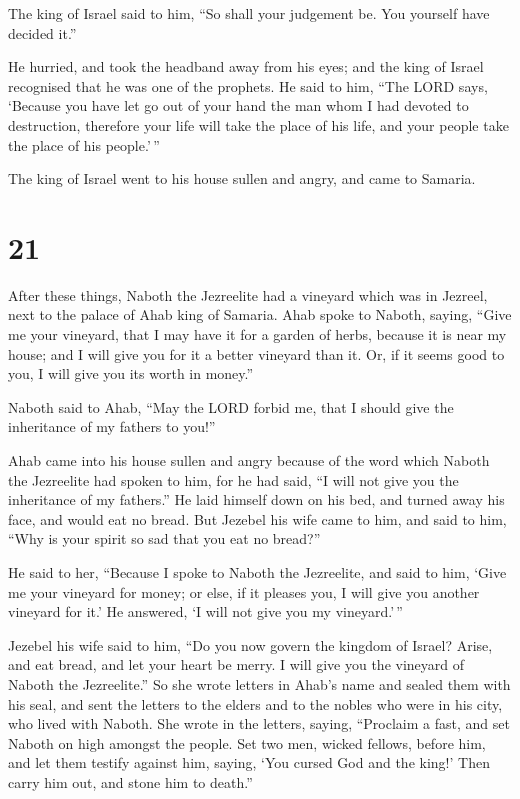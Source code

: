 The king of Israel said to him, ``So shall your judgement be. You
yourself have decided it.''

 He hurried, and took the headband away from his eyes; and
the king of Israel recognised that he was one of the prophets.
 He said to him, ``The LORD says, `Because you have let go
out of your hand the man whom I had devoted to destruction, therefore
your life will take the place of his life, and your people take the
place of his people.'\,''

 The king of Israel went to his house sullen and angry, and
came to Samaria.

\hypertarget{section-20}{%
\section{21}\label{section-20}}

 After these things, Naboth the Jezreelite had a vineyard
which was in Jezreel, next to the palace of Ahab king of Samaria.
 Ahab spoke to Naboth, saying, ``Give me your vineyard, that
I may have it for a garden of herbs, because it is near my house; and I
will give you for it a better vineyard than it. Or, if it seems good to
you, I will give you its worth in money.''

 Naboth said to Ahab, ``May the LORD forbid me, that I
should give the inheritance of my fathers to you!''

 Ahab came into his house sullen and angry because of the
word which Naboth the Jezreelite had spoken to him, for he had said, ``I
will not give you the inheritance of my fathers.'' He laid himself down
on his bed, and turned away his face, and would eat no bread.
 But Jezebel his wife came to him, and said to him, ``Why is
your spirit so sad that you eat no bread?''

 He said to her, ``Because I spoke to Naboth the Jezreelite,
and said to him, `Give me your vineyard for money; or else, if it
pleases you, I will give you another vineyard for it.' He answered, `I
will not give you my vineyard.'\,''

 Jezebel his wife said to him, ``Do you now govern the
kingdom of Israel? Arise, and eat bread, and let your heart be merry. I
will give you the vineyard of Naboth the Jezreelite.''  So
she wrote letters in Ahab's name and sealed them with his seal, and sent
the letters to the elders and to the nobles who were in his city, who
lived with Naboth.  She wrote in the letters, saying,
``Proclaim a fast, and set Naboth on high amongst the people.
 Set two men, wicked fellows, before him, and let them
testify against him, saying, `You cursed God and the king!' Then carry
him out, and stone him to death.''

